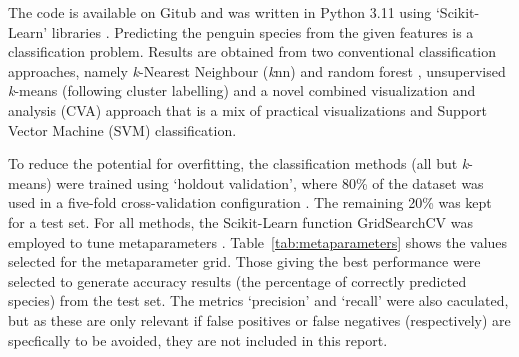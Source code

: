 \documentclass[12pt]{article}
\begin{document}
The code is available on Gitub \cite{TimAIRepo} and was written in Python 3.11 \cite{python311} 
using ‘Scikit-Learn’ libraries \cite{scikit-learn}.
Predicting the penguin species from the given features is a classification problem. 
Results are obtained from two conventional classification approaches, 
namely \textit{k}-Nearest Neighbour (\textit{k}nn) \cite{bishop2006pattern} and random forest \cite{breiman2001random}, 
unsupervised \textit{k}-means (following cluster labelling) \cite{tan2005introduction} 
and a novel combined visualization and analysis (CVA) approach that is a mix of 
practical visualizations and Support Vector Machine (SVM) classification.

To reduce the potential for overfitting, the classification methods (all but \textit{k}-means) were trained using 
`holdout validation', where 80\% of the dataset was used in a five-fold cross-validation 
configuration \cite{james2013introduction}. The remaining 20\% was kept for a test set. For all methods, 
the Scikit-Learn function GridSearchCV was employed to tune metaparameters \cite{scikit-learn}. 
Table~\ref{tab:metaparameters} shows the values selected for the metaparameter grid. Those giving the best 
performance were selected to generate accuracy results (the percentage of correctly predicted species) 
from the test set. The metrics `precision' and `recall' were also caculated, but as 
these are only relevant if false positives or false negatives (respectively) are specfically to be avoided, 
they are not included in this report.   
\end{document}
